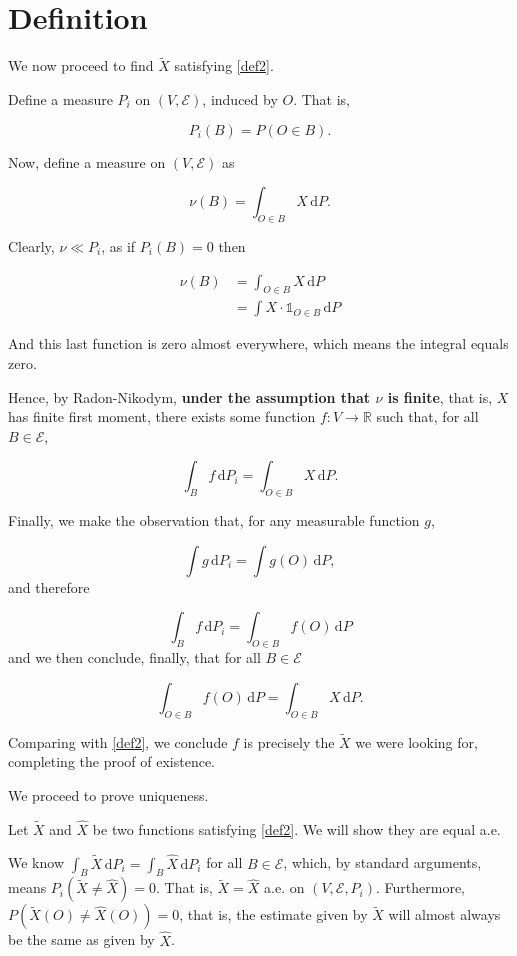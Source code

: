 \documentclass{article}
\let\mathbbalt\mathbb
\let\mathbbu\mathbb
\let\mathbb\mathbbalt
\newcommand{\E}{\mathcal{E}}
\newcommand{\R}{\mathbb{R}}
\newcommand{\dd}{\,\mathrm{d}}
\newcommand{\ind}{\mathbbu{1}}
\begin{document}
	\section{Definition}
	
	We now proceed to find $\tilde X$ satisfying \eqref{def2}.
	
	Define a measure $P_i$ on $(V, \E)$, induced by $O$. That is,
	
	\[P_i(B) = P(O \in B).\]
	
	Now, define a measure on $(V, \E)$ as
	
	\[\nu(B) = \int_{O \in B} X \dd P.\]
	
	Clearly, $\nu \ll P_i$, as if $P_i(B) = 0$ then
	
	\begin{align*}
	\nu(B) &= \int_{O \in B} X \dd P\\
	&= \int X \cdot \ind_{O \in B} \dd P
	\end{align*}
	
	And this last function is zero almost everywhere, which means the integral equals zero.
	
	Hence, by Radon-Nikodym, \textbf{under the assumption that $\nu$ is finite}, that is, $X$ has finite first moment, there exists some function $f : V \to \R$ such that, for all $B \in \E$,
	
	\[\int_B f \dd P_i = \int_{O \in B} X \dd P.\]
	
	Finally, we make the observation that, for any measurable function $g$,
	
	\[\int g \dd P_i = \int g(O) \dd P,\]
	and therefore
	
	\[\int_B f \dd P_i = \int_{O \in B} f(O) \dd P\]
	and we then conclude, finally, that for all $B \in \E$
	
	\[\int_{O \in B} f(O) \dd P = \int_{O \in B} X \dd P.\]
	
	Comparing with \eqref{def2}, we conclude $f$ is precisely the $\tilde X$ we were looking for, completing the proof of existence.
	
	We proceed to prove uniqueness.
	
	Let $\tilde X$ and $\hat X$ be two functions satisfying \eqref{def2}. We will show they are equal a.e.
	
	We know $\int_B \tilde X \dd P_i = \int_B \hat X \dd P_i$ for all $B \in \E$, which, by standard arguments, means $P_i(\tilde X \neq \hat X) = 0$. That is, $\tilde X = \hat X$ a.e. on $(V, \E, P_i)$. Furthermore, $P(\tilde X(O) \neq \hat X(O)) = 0$, that is, the estimate given by $\tilde X$ will almost always be the same as given by $\hat X$. 
	
\end{document}
